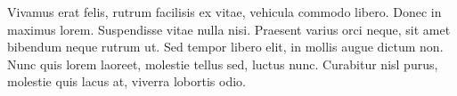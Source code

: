 Vivamus erat felis, rutrum facilisis ex vitae, vehicula commodo libero. Donec in maximus lorem. Suspendisse vitae nulla nisi. Praesent varius orci neque, sit amet bibendum neque rutrum ut. Sed tempor libero elit, in mollis augue dictum non. Nunc quis lorem laoreet, molestie tellus sed, luctus nunc. Curabitur nisl purus, molestie quis lacus at, viverra lobortis odio.
